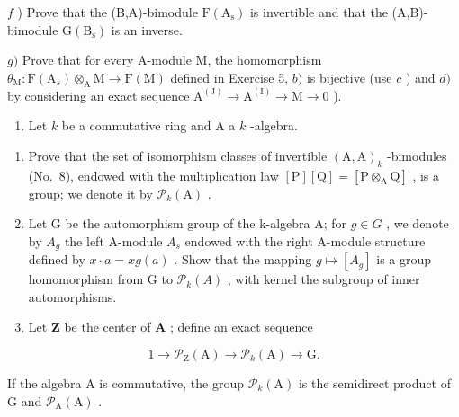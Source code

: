 \(f\) ) Prove that the (B,A)-bimodule \(\mathrm{F(A_s)}\) is invertible and that the (A,B)-bimodule \(\mathrm{G(B_s)}\) is an inverse.

\(g)\) Prove that for every A-module M, the homomorphism \(\theta_{\mathrm{M}}: \mathrm{F}(\mathrm{A}_s) \otimes_{\mathrm{A}} \mathrm{M} \to \mathrm{F}(\mathrm{M})\) defined in Exercise 5, \(b)\) is bijective (use \(c\) ) and \(d)\) by considering an exact sequence \(\mathrm{A}^{(\mathrm{J})} \to \mathrm{A}^{(\mathrm{I})} \to \mathrm{M} \to 0\) ).

\begin{enumerate}
\def\labelenumi{\arabic{enumi})}
\setcounter{enumi}{7}
\tightlist
\item
  Let \(k\) be a commutative ring and A a \(k\) -algebra.
\end{enumerate}

\begin{enumerate}
\def\labelenumi{\alph{enumi})}
\item
  Prove that the set of isomorphism classes of invertible \((\mathrm{A},\mathrm{A})_k\) -bimodules (No.~8), endowed with the multiplication law \([\mathrm{P}][\mathrm{Q}] = [\mathrm{P}\otimes_{\mathrm{A}}\mathrm{Q}]\) , is a group; we denote it by \(\mathcal{P}_k(\mathrm{A})\) .
\item
  Let G be the automorphism group of the k-algebra A; for \(g \in G\) , we denote by \(A_{g}\) the left A-module \(A_{s}\) endowed with the right A-module structure defined by \(x \cdot a = x g(a)\) . Show that the mapping \(g \mapsto [A_{g}]\) is a group homomorphism from G to \(\mathcal{P}_{k}(A)\) , with kernel the subgroup of inner automorphisms.
\item
  Let \(\mathbf{Z}\) be the center of \(\mathbf{A}\) ; define an exact sequence
\end{enumerate}

\[
1 \to \mathcal {P} _ {\mathrm{Z}} (\mathrm{A}) \to \mathcal {P} _ {k} (\mathrm{A}) \to \mathrm{G}.
\]

If the algebra A is commutative, the group \(\mathcal{P}_{k}(\mathrm{A})\) is the semidirect product of G and \(\mathcal{P}_{\mathrm{A}}(\mathrm{A})\) .

